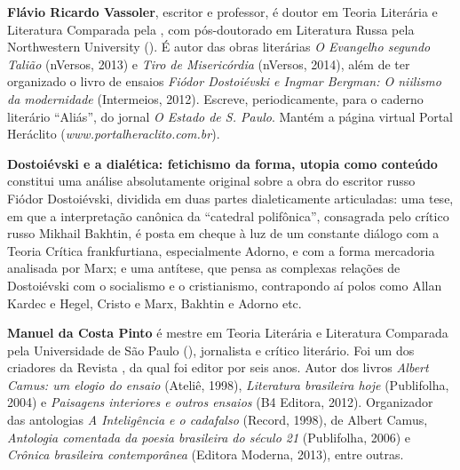 
\textbf{Flávio Ricardo Vassoler}, escritor e professor, é doutor em Teoria Literária e Literatura Comparada pela , com pós-doutorado em Literatura Russa pela Northwestern University (). É autor das obras literárias \emph{O Evangelho segundo Talião} (nVersos, 2013) e \emph{Tiro de Misericórdia} (nVersos, 2014), além de ter organizado o livro de ensaios \emph{Fiódor Dostoiévski e Ingmar Bergman: O niilismo da modernidade} (Intermeios, 2012). Escreve, periodicamente, para o caderno literário ``Aliás'', do jornal \emph{O Estado de S. Paulo}. Mantém a página virtual Portal Heráclito (\emph{www.portalheraclito.com.br}).

\textbf{Dostoiévski e a dialética: fetichismo da forma, utopia como conteúdo} constitui uma análise absolutamente original sobre a obra do escritor russo Fiódor Dostoiévski, dividida em duas partes dialeticamente articuladas: uma tese, em que a interpretação canônica da ``catedral polifônica'', consagrada pelo crítico russo Mikhail Bakhtin, é posta em cheque à luz de um constante diálogo com a Teoria Crítica frankfurtiana, especialmente Adorno, e com a forma mercadoria analisada por Marx; e uma antítese, que pensa as complexas relações de Dostoiévski com o socialismo e o cristianismo, contrapondo aí polos como Allan Kardec e Hegel, Cristo e Marx, Bakhtin e Adorno etc.

\textbf{Manuel da Costa Pinto} é mestre em Teoria Literária e Literatura Comparada pela Universidade de São Paulo (), jornalista e crítico literário. Foi um dos criadores da Revista , da qual foi editor por seis anos. Autor dos livros \emph{Albert Camus: um elogio do ensaio} (Ateliê, 1998), \emph{Literatura brasileira hoje} (Publifolha, 2004) e \emph{Paisagens interiores e outros ensaios} (B4 Editora, 2012). Organizador das antologias \emph{A Inteligência e o cadafalso} (Record, 1998), de Albert Camus, \emph{Antologia comentada da poesia brasileira do século 21} (Publifolha, 2006) e \emph{Crônica brasileira contemporânea} (Editora Moderna, 2013), entre outras.






